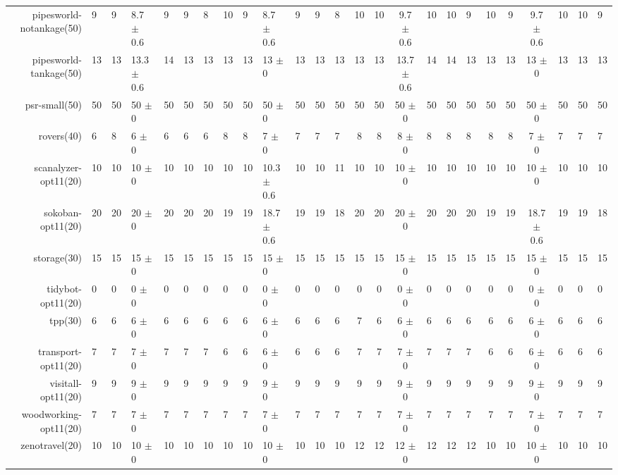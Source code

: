 \begin{center}
\begin{tabular}{|rHHHHHHHHHHHHcccHHH|cccHHH|}
pipesworld-notankage(50) & 9 & 9 & 8.7 \(\pm\) 0.6 & 9 & 9 & 8 & 10 & 9 & 8.7 \(\pm\) 0.6 & 9 & 9 & 8 & 10 & 10 & 9.7 \(\pm\) 0.6 & 10 & 10 & 9 & 10 & 9 & 9.7 \(\pm\) 0.6 & 10 & 10 & 9\\
pipesworld-tankage(50) & 13 & 13 & 13.3 \(\pm\) 0.6 & 14 & 13 & 13 & 13 & 13 & 13 \(\pm\) 0 & 13 & 13 & 13 & 13 & 13 & 13.7 \(\pm\) 0.6 & 14 & 14 & 13 & 13 & 13 & 13 \(\pm\) 0 & 13 & 13 & 13\\
psr-small(50) & 50 & 50 & 50 \(\pm\) 0 & 50 & 50 & 50 & 50 & 50 & 50 \(\pm\) 0 & 50 & 50 & 50 & 50 & 50 & 50 \(\pm\) 0 & 50 & 50 & 50 & 50 & 50 & 50 \(\pm\) 0 & 50 & 50 & 50\\
rovers(40) & 6 & 8 & 6 \(\pm\) 0 & 6 & 6 & 6 & 8 & 8 & 7 \(\pm\) 0 & 7 & 7 & 7 & 8 & 8 & 8 \(\pm\) 0 & 8 & 8 & 8 & 8 & 8 & 7 \(\pm\) 0 & 7 & 7 & 7\\
scanalyzer-opt11(20) & 10 & 10 & 10 \(\pm\) 0 & 10 & 10 & 10 & 10 & 10 & 10.3 \(\pm\) 0.6 & 10 & 10 & 11 & 10 & 10 & 10 \(\pm\) 0 & 10 & 10 & 10 & 10 & 10 & 10 \(\pm\) 0 & 10 & 10 & 10\\
sokoban-opt11(20) & 20 & 20 & 20 \(\pm\) 0 & 20 & 20 & 20 & 19 & 19 & 18.7 \(\pm\) 0.6 & 19 & 19 & 18 & 20 & 20 & 20 \(\pm\) 0 & 20 & 20 & 20 & 19 & 19 & 18.7 \(\pm\) 0.6 & 19 & 19 & 18\\
storage(30) & 15 & 15 & 15 \(\pm\) 0 & 15 & 15 & 15 & 15 & 15 & 15 \(\pm\) 0 & 15 & 15 & 15 & 15 & 15 & 15 \(\pm\) 0 & 15 & 15 & 15 & 15 & 15 & 15 \(\pm\) 0 & 15 & 15 & 15\\
tidybot-opt11(20) & 0 & 0 & 0 \(\pm\) 0 & 0 & 0 & 0 & 0 & 0 & 0 \(\pm\) 0 & 0 & 0 & 0 & 0 & 0 & 0 \(\pm\) 0 & 0 & 0 & 0 & 0 & 0 & 0 \(\pm\) 0 & 0 & 0 & 0\\
tpp(30) & 6 & 6 & 6 \(\pm\) 0 & 6 & 6 & 6 & 6 & 6 & 6 \(\pm\) 0 & 6 & 6 & 6 & 7 & 6 & 6 \(\pm\) 0 & 6 & 6 & 6 & 6 & 6 & 6 \(\pm\) 0 & 6 & 6 & 6\\
transport-opt11(20) & 7 & 7 & 7 \(\pm\) 0 & 7 & 7 & 7 & 6 & 6 & 6 \(\pm\) 0 & 6 & 6 & 6 & 7 & 7 & 7 \(\pm\) 0 & 7 & 7 & 7 & 6 & 6 & 6 \(\pm\) 0 & 6 & 6 & 6\\
visitall-opt11(20) & 9 & 9 & 9 \(\pm\) 0 & 9 & 9 & 9 & 9 & 9 & 9 \(\pm\) 0 & 9 & 9 & 9 & 9 & 9 & 9 \(\pm\) 0 & 9 & 9 & 9 & 9 & 9 & 9 \(\pm\) 0 & 9 & 9 & 9\\
woodworking-opt11(20) & 7 & 7 & 7 \(\pm\) 0 & 7 & 7 & 7 & 7 & 7 & 7 \(\pm\) 0 & 7 & 7 & 7 & 7 & 7 & 7 \(\pm\) 0 & 7 & 7 & 7 & 7 & 7 & 7 \(\pm\) 0 & 7 & 7 & 7\\
zenotravel(20) & 10 & 10 & 10 \(\pm\) 0 & 10 & 10 & 10 & 10 & 10 & 10 \(\pm\) 0 & 10 & 10 & 10 & 12 & 12 & 12 \(\pm\) 0 & 12 & 12 & 12 & 10 & 10 & 10 \(\pm\) 0 & 10 & 10 & 10\\
\hline
\end{tabular}
\end{center}
